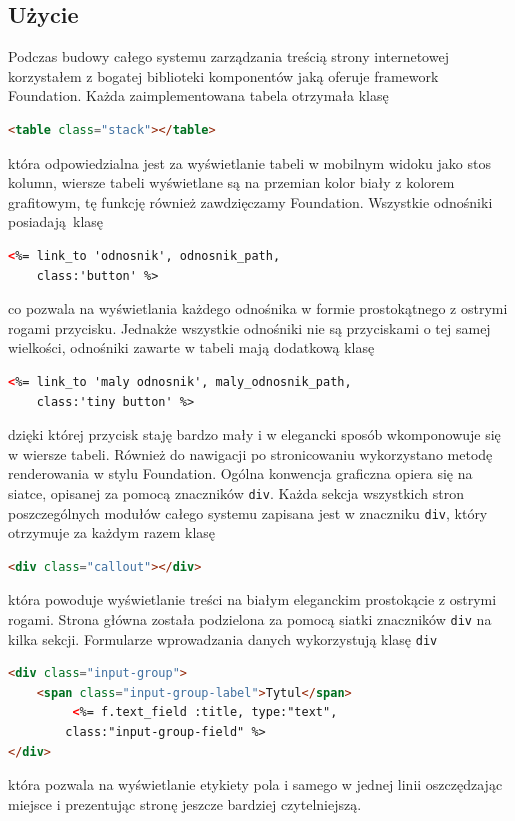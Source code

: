 \documentclass[openright]{xmgr}
\begin{document}
\subsection{Użycie}
Podczas budowy całego systemu zarządzania treścią strony internetowej korzystałem z bogatej biblioteki komponentów jaką oferuje framework Foundation. Każda zaimplementowana tabela otrzymała klasę 
\begin{lstlisting}[language=html, caption={Przykładowa tabela}]
<table class="stack"></table>
\end{lstlisting}
która odpowiedzialna jest za wyświetlanie tabeli w mobilnym widoku jako stos kolumn, wiersze tabeli wyświetlane są na przemian kolor biały z kolorem grafitowym, tę funkcję również  zawdzięczamy Foundation. Wszystkie odnośniki \mbox{posiadają klasę}
\begin{lstlisting}[language=html, caption={Przykladowy przycisk}]
<%= link_to 'odnosnik', odnosnik_path, 
	class:'button' %>
\end{lstlisting}
co pozwala na wyświetlania każdego odnośnika w formie prostokątnego z ostrymi rogami przycisku. Jednakże wszystkie odnośniki nie są przyciskami o tej samej wielkości, odnośniki zawarte w tabeli mają dodatkową klasę 
\begin{lstlisting}[language=html, caption={Przykładowy przycisk}]
<%= link_to 'maly odnosnik', maly_odnosnik_path, 
	class:'tiny button' %>
\end{lstlisting}
dzięki której przycisk staję bardzo mały i w elegancki sposób wkomponowuje się w wiersze tabeli. Również do nawigacji po stronicowaniu wykorzystano metodę renderowania w stylu Foundation. Ogólna konwencja graficzna opiera się na siatce, opisanej za pomocą znaczników \texttt{div}. Każda sekcja wszystkich stron poszczególnych modułów całego systemu zapisana jest w znaczniku \texttt{div}, który otrzymuje za każdym razem klasę 
\begin{lstlisting}[language=html, caption={Przykładowy div}]
<div class="callout"></div>
\end{lstlisting}
która powoduje wyświetlanie treści na białym eleganckim prostokącie z ostrymi rogami. Strona główna została podzielona za pomocą siatki znaczników \texttt{div} na kilka sekcji. Formularze wprowadzania danych wykorzystują klasę \texttt{div} 
\begin{lstlisting}[language=html, caption={Przykładowe pole tekstowe}]
<div class="input-group">
	<span class="input-group-label">Tytul</span>
         <%= f.text_field :title, type:"text", 
		class:"input-group-field" %>
</div>
\end{lstlisting}
która pozwala na wyświetlanie etykiety pola i samego w jednej linii oszczędzając miejsce i prezentując stronę jeszcze bardziej czytelniejszą. 
\end{document}

